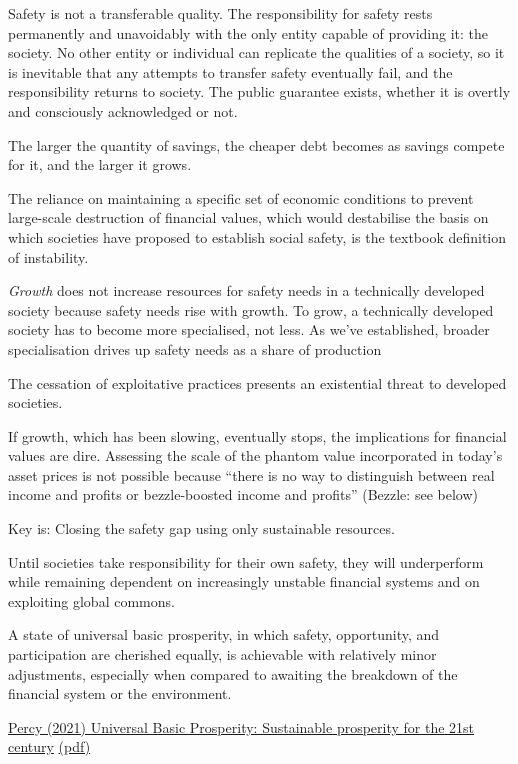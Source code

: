 \documentclass[
]{book}
\begin{document}
Safety is not a transferable quality. The responsibility for safety rests permanently and unavoidably
with the only entity capable of providing it: the society. No other entity or individual can replicate
the qualities of a society, so it is inevitable that any attempts to transfer safety eventually fail, and the
responsibility returns to society. The public guarantee exists, whether it is overtly and consciously
acknowledged or not.

The larger the quantity of savings, the cheaper debt becomes
as savings compete for it, and the larger it grows.

The reliance on maintaining a specific set of economic conditions to prevent large-scale destruction
of financial values, which would destabilise the basis on which societies have proposed to establish
social safety, is the textbook definition of instability.

\emph{Growth} does not increase resources for safety needs in a technically developed society because safety
needs rise with growth. To grow, a technically developed society has to become more specialised,
not less. As we've established, broader specialisation drives up safety needs as a share of production

The cessation of exploitative practices presents an existential threat
to developed societies.

If growth, which has been slowing, eventually stops, the implications for financial values are dire.
Assessing the scale of the phantom value incorporated in today's asset prices is not possible because
``there is no way to distinguish between real income and profits or bezzle-boosted income and
profits'' (Bezzle: see below)

Key is: Closing the safety gap using only sustainable resources.

Until societies take responsibility for their own safety, they will underperform while remaining dependent on increasingly unstable financial systems and on exploiting global commons.

A state of universal basic prosperity, in which safety, opportunity, and participation are cherished equally, is achievable with relatively minor adjustments, especially when compared to awaiting the breakdown of the financial system or the environment.

\href{https://discovery.ucl.ac.uk/id/eprint/10138869/}{Percy (2021) Universal Basic Prosperity: Sustainable prosperity for the 21st century}
\href{pdf/Percy_2021_Universal_Basic_Prosperity.pdf}{(pdf)}
\end{document}
